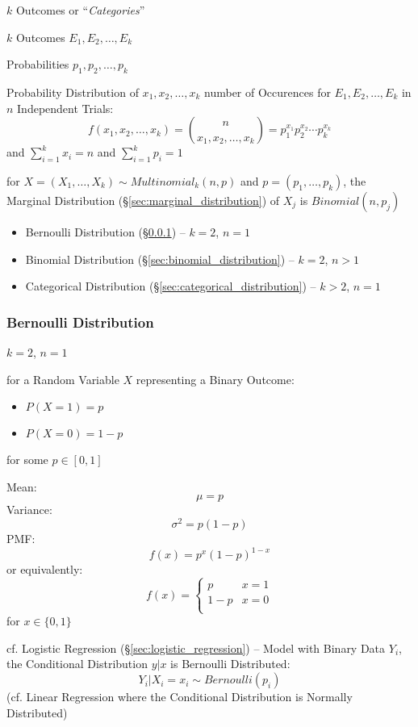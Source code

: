 $k$ Outcomes or ``\emph{Categories}''

$k$ Outcomes $E_1, E_2, \ldots, E_k$

Probabilities $p_1, p_2, \ldots, p_k$

Probability Distribution of $x_1, x_2, \ldots, x_k$ number of
Occurences for $E_1, E_2, \ldots, E_k$ in $n$ Independent Trials:
\[
  f(x_1, x_2, \ldots, x_k) = \binom{n}{x_1, x_2, \ldots, x_k} =
    p_1^{x_1} p_2^{x_2} \cdots p_k^{x_k}
\]
and $\sum_{i=1}^k x_i = n$ and $\sum_{i=1}^k {p_i} = 1$

for $X = (X_1, \ldots, X_k) \sim Multinomial_k(n, p)$ and
$p = (p_1, \ldots, p_k)$, the Marginal Distribution
(\S\ref{sec:marginal_distribution}) of $X_j$ is $Binomial (n, p_j)$

\begin{itemize}
  \item Bernoulli Distribution (\S\ref{sec:bernoulli_distribution}) -- $k = 2$,
    $n = 1$
  \item Binomial Distribution (\S\ref{sec:binomial_distribution}) -- $k = 2$,
    $n > 1$
  \item Categorical Distribution (\S\ref{sec:categorical_distribution}) --
    $k > 2$, $n = 1$
\end{itemize}



\subsubsection{Bernoulli Distribution}\label{sec:bernoulli_distribution}

$k = 2$, $n = 1$

for a Random Variable $X$ representing a Binary Outcome:
\begin{itemize}
  \item $P(X=1) = p$
  \item $P(X=0) = 1-p$
\end{itemize}
for some $p \in [0,1]$

Mean:
\[
  \mu = p
\]
Variance:
\[
  \sigma^2 = p(1-p)
\]
PMF:
\[
  f(x) = p^x(1-p)^{1-x}
\]
or equivalently:
\[
  f(x) = \begin{cases}
    p   & x = 1 \\
    1-p & x = 0 \\
  \end{cases}
\]
for $x \in \{0, 1\}$

\fist cf. Logistic Regression (\S\ref{sec:logistic_regression}) -- Model with
Binary Data $Y_i$, the Conditional Distribution $y | x$ is Bernoulli
Distributed:
\[
  Y_i | X_i = x_i \sim Bernoulli(p_i)
\]
(cf. Linear Regression where the Conditional Distribution is Normally
Distributed)

